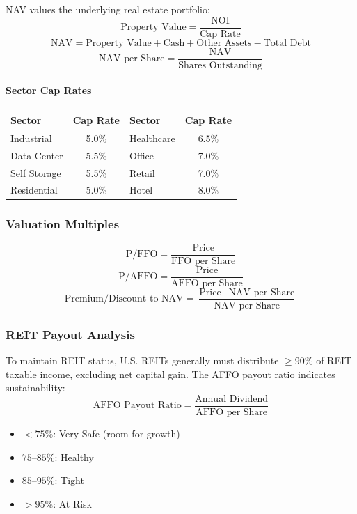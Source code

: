 NAV values the underlying real estate portfolio:
\[
\text{Property Value} = \frac{\text{NOI}}{\text{Cap Rate}}
\]
\[
\text{NAV} = \text{Property Value} + \text{Cash} + \text{Other Assets} - \text{Total Debt}
\]
\[
\text{NAV per Share} = \frac{\text{NAV}}{\text{Shares Outstanding}}
\]

\paragraph{Sector Cap Rates}

\begin{center}
\begin{tabular}{lclc}
\textbf{Sector} & \textbf{Cap Rate} & \textbf{Sector} & \textbf{Cap Rate} \\
\hline
Industrial & 5.0\% & Healthcare & 6.5\% \\
Data Center & 5.5\% & Office & 7.0\% \\
Self Storage & 5.5\% & Retail & 7.0\% \\
Residential & 5.0\% & Hotel & 8.0\% \\
\end{tabular}
\end{center}

\subsubsection{Valuation Multiples}

\[
\text{P/FFO} = \frac{\text{Price}}{\text{FFO per Share}}
\]
\[
\text{P/AFFO} = \frac{\text{Price}}{\text{AFFO per Share}}
\]
\[
\text{Premium/Discount to NAV} = \frac{\text{Price} - \text{NAV per Share}}{\text{NAV per Share}}
\]

\subsubsection{REIT Payout Analysis}

To maintain REIT status, U.S. REITs generally must distribute $\geq 90\%$ of REIT taxable income, excluding net capital gain. The AFFO payout ratio indicates sustainability:
\[
\text{AFFO Payout Ratio} = \frac{\text{Annual Dividend}}{\text{AFFO per Share}}
\]

\begin{itemize}
  \item[] $< 75\%$: Very Safe (room for growth)
  \item[] $75$--$85\%$: Healthy
  \item[] $85$--$95\%$: Tight
  \item[] $> 95\%$: At Risk
\end{itemize}


